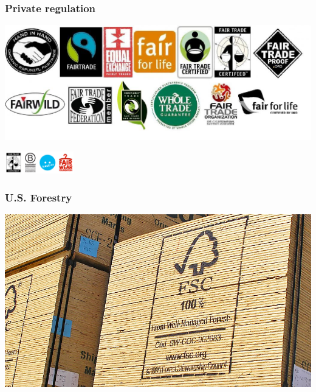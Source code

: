 \documentclass[10pt]{beamer}
\begin{document}
\begin{frame}
\frametitle{Private regulation}
\includegraphics[width = \textwidth]{fair}

\includegraphics[trim =8cm 0 0 0, clip, width = 3cm]{fair2}
\end{frame}



\begin{frame}
\frametitle{U.S. Forestry }
\includegraphics[width = \textwidth]{fscwood}
\end{frame}
\end{document}
